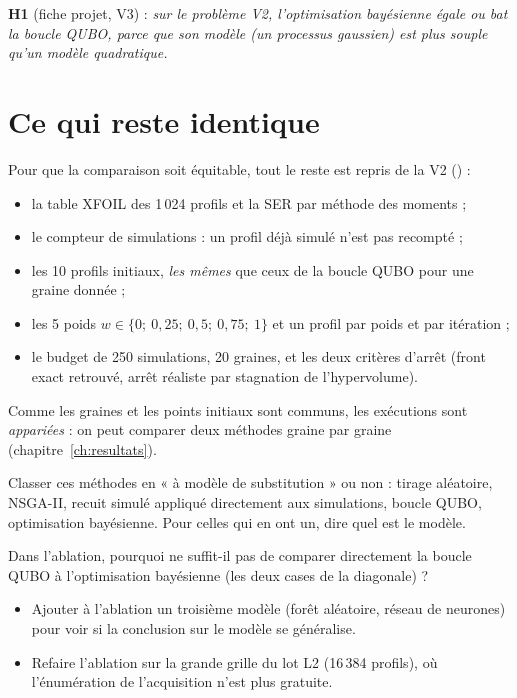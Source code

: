 \begin{resultat}
\textbf{H1} (fiche projet, V3) : \emph{sur le problème V2, l'optimisation bayésienne égale ou bat la boucle QUBO, parce que son modèle (un processus gaussien) est plus souple qu'un modèle quadratique.}
\end{resultat}

\section{Ce qui reste identique}
Pour que la comparaison soit équitable, tout le reste est repris de la V2 () :
\begin{itemize}
\item la table XFOIL des 1\,024 profils et la SER par méthode des moments ;
\item le compteur de simulations  : un profil déjà simulé n'est pas recompté ;
\item les 10 profils initiaux, \emph{les mêmes} que ceux de la boucle QUBO pour une graine donnée ;
\item les 5 poids $w\in\{0;\ 0{,}25;\ 0{,}5;\ 0{,}75;\ 1\}$ et un profil par poids et par itération ;
\item le budget de 250 simulations, 20 graines, et les deux critères d'arrêt (front exact retrouvé, arrêt réaliste par stagnation de l'hypervolume).
\end{itemize}
Comme les graines et les points initiaux sont communs, les exécutions sont \emph{appariées} : on peut comparer deux méthodes graine par graine (chapitre~\ref{ch:resultats}).

\exercices
\begin{exercice}
Classer ces méthodes en « à modèle de substitution » ou non : tirage aléatoire, NSGA-II, recuit simulé appliqué directement aux simulations, boucle QUBO, optimisation bayésienne. Pour celles qui en ont un, dire quel est le modèle.
\end{exercice}
\begin{exercice}
Dans l'ablation, pourquoi ne suffit-il pas de comparer directement la boucle QUBO à l'optimisation bayésienne (les deux cases de la diagonale) ?
\end{exercice}

\begin{pistes}
\begin{itemize}
\item Ajouter à l'ablation un troisième modèle (forêt aléatoire, réseau de neurones) pour voir si la conclusion sur le modèle se généralise.
\item Refaire l'ablation sur la grande grille du lot L2 (16\,384 profils), où l'énumération de l'acquisition n'est plus gratuite.
\end{itemize}
\end{pistes}
